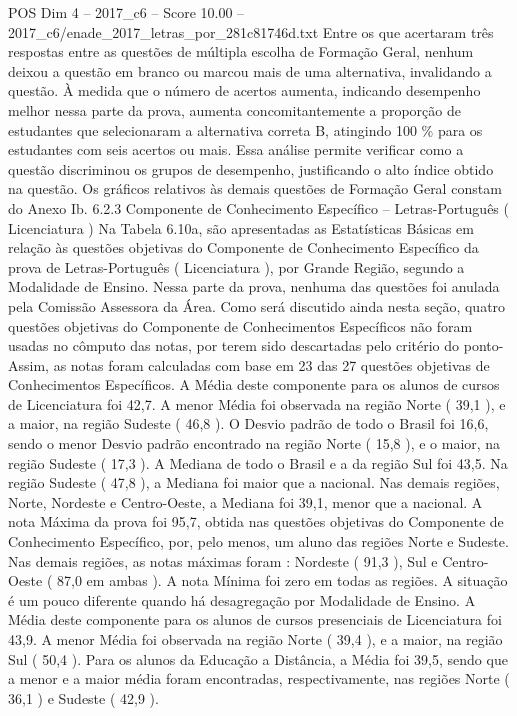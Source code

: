 \begin{textsample}{POS Dim 4 – 2017\_c6 – Score 10.00 – 2017\_c6/enade\_2017\_letras\_por\_281c81746d.txt}
Entre os que acertaram três respostas entre as questões de múltipla escolha de Formação Geral, nenhum deixou a questão em branco ou marcou mais de uma alternativa, invalidando a questão.
À medida que o número de acertos aumenta, indicando desempenho melhor nessa parte da prova, aumenta concomitantemente a proporção de estudantes que selecionaram a alternativa correta B, atingindo 100 \% para os estudantes com seis acertos ou mais.
Essa análise permite verificar como a questão discriminou os grupos de desempenho, justificando o alto índice obtido na questão.
Os gráficos relativos às demais questões de Formação Geral constam do Anexo Ib. 6.2.3 Componente de Conhecimento Específico – Letras-Português ( Licenciatura ) Na Tabela 6.10a, são apresentadas as Estatísticas Básicas em relação às questões objetivas do Componente de Conhecimento Específico da prova de Letras-Português ( Licenciatura ), por Grande Região, segundo a Modalidade de Ensino.
Nessa parte da prova, nenhuma das questões foi anulada pela Comissão Assessora da Área.
Como será discutido ainda nesta seção, quatro questões objetivas do Componente de Conhecimentos Específicos não foram usadas no cômputo das notas, por terem sido descartadas pelo critério do ponto- Assim, as notas foram calculadas com base em 23 das 27 questões objetivas de Conhecimentos Específicos.
A Média deste componente para os alunos de cursos de Licenciatura foi 42,7.
A menor Média foi observada na região Norte ( 39,1 ), e a maior, na região Sudeste ( 46,8 ).
O Desvio padrão de todo o Brasil foi 16,6, sendo o menor Desvio padrão encontrado na região Norte ( 15,8 ), e o maior, na região Sudeste ( 17,3 ).
A Mediana de todo o Brasil e a da região Sul foi 43,5.
Na região Sudeste ( 47,8 ), a Mediana foi maior que a nacional.
Nas demais regiões, Norte, Nordeste e Centro-Oeste, a Mediana foi 39,1, menor que a nacional.
A nota Máxima da prova foi 95,7, obtida nas questões objetivas do Componente de Conhecimento Específico, por, pelo menos, um aluno das regiões Norte e Sudeste.
Nas demais regiões, as notas máximas foram : Nordeste ( 91,3 ), Sul e Centro-Oeste ( 87,0 em ambas ).
A nota Mínima foi zero em todas as regiões.
A situação é um pouco diferente quando há desagregação por Modalidade de Ensino.
A Média deste componente para os alunos de cursos presenciais de Licenciatura foi 43,9.
A menor Média foi observada na região Norte ( 39,4 ), e a maior, na região Sul ( 50,4 ).
Para os alunos da Educação a Distância, a Média foi 39,5, sendo que a menor e a maior média foram encontradas, respectivamente, nas regiões Norte ( 36,1 ) e Sudeste ( 42,9 ).

\end{textsample}
